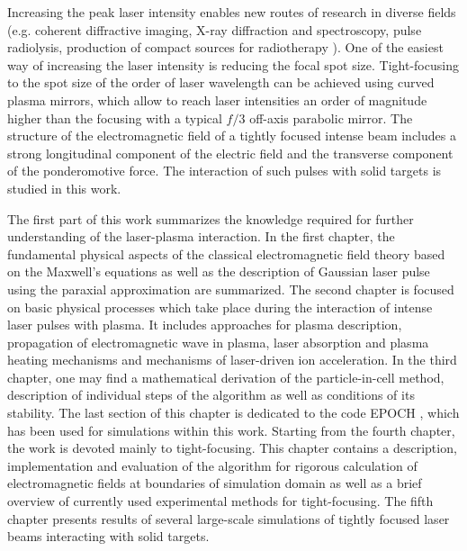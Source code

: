 Increasing the peak laser intensity enables new routes of research in diverse fields (e.g. coherent diffractive imaging, X-ray diffraction and spectroscopy, pulse radiolysis, production of compact sources for radiotherapy \cite{Zewail2010, Bulanov2004, Malka2004}). One of the easiest way of increasing the laser intensity is reducing the focal spot size. Tight-focusing to the spot size of the order of laser wavelength can be achieved using curved plasma mirrors, which allow to reach laser intensities an order of magnitude higher than the focusing with a typical $ f/3 $ off-axis parabolic mirror. The structure of the electromagnetic field of a tightly focused intense beam includes a strong longitudinal component of the electric field and the transverse component of the ponderomotive force. The interaction of such pulses with solid targets is studied in this work.

The first part of this work summarizes the knowledge required for further understanding of the laser-plasma interaction. In the first chapter, the fundamental physical aspects of the classical electromagnetic field theory \cite{Stratton2007, Jackson2005, Feynman1963, Thide2011} based on the Maxwell's equations as well as the description of Gaussian laser pulse using the paraxial approximation \cite{Born2013} are summarized. The second chapter is focused on basic physical processes which take place during the interaction of intense laser pulses with plasma. It includes approaches for plasma description, propagation of electromagnetic wave in plasma, laser absorption and plasma heating mechanisms and mechanisms of laser-driven ion acceleration. In the third chapter, one may find a mathematical derivation of the particle-in-cell method, description of individual steps of the algorithm as well as conditions of its stability. The last section of this chapter is dedicated to the code EPOCH \cite{bennett}, which has been used for simulations within this work. Starting from the fourth chapter, the work is devoted mainly to tight-focusing. This chapter contains a description, implementation and evaluation of the algorithm for rigorous calculation of electromagnetic fields at boundaries of simulation domain \cite{Thiele2016} as well as a brief overview of currently used experimental methods for tight-focusing. The fifth chapter presents results of several large-scale simulations of tightly focused laser beams interacting with solid targets.

